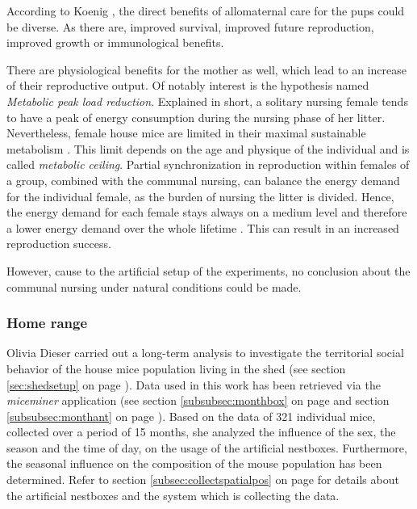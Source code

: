 According to Koenig \cite{koenig:06}, the direct benefits of allomaternal care for the pups could be diverse. As there are, improved survival, improved future reproduction, improved growth or immunological benefits.

There are physiological benefits for the mother as well, which lead to an increase of their reproductive output. Of notably interest is the hypothesis named \textit{Metabolic peak load reduction}. Explained in short, a solitary nursing female tends to have a peak of energy consumption during the nursing phase of her litter. Nevertheless, female house mice are limited in their maximal sustainable metabolism \cite{hammond:92}. This limit depends on the age and physique of the individual and is called \textit{metabolic ceiling}. Partial synchronization in reproduction within females of a group, combined with the communal nursing, can balance the energy demand for the individual female, as the burden of nursing the litter is divided. Hence, the energy demand for each female stays always on a medium level and therefore a lower energy demand over the whole lifetime \cite{koenig:06}. This can result in an increased reproduction success.

However, cause to the artificial setup of the experiments, no conclusion about the communal nursing under natural conditions could be made.

\subsubsection{Home range}
\label{subsubsec:homerange}

Olivia Dieser \cite{dieser:08} carried out a long-term analysis to investigate the territorial social behavior of the house mice population living in the shed (see section \ref{sec:shedsetup} on page \pageref{sec:shedsetup}). Data used in this work has been retrieved via the \textit{miceminer} application (see section \ref{subsubsec:monthbox} on page \pageref{subsubsec:monthbox} and section \ref{subsubsec:monthant} on page \pageref{subsubsec:monthant}). Based on the data of 321 individual mice, collected over a period of 15 months, she analyzed the influence of the sex, the season and the time of day, on the usage of the artificial nestboxes. Furthermore, the seasonal influence on the composition of the mouse population has been determined. Refer to section \ref{subsec:collectspatialpos} on page \pageref{subsec:collectspatialpos} for details about the artificial nestboxes and the system which is collecting the data.

